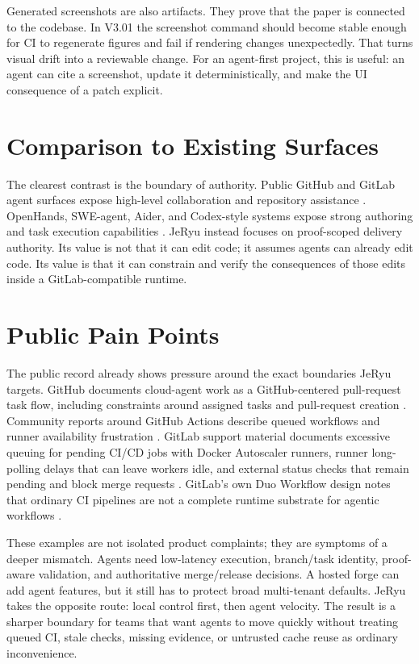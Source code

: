\documentclass[conference]{IEEEtran}
\begin{document}
Generated screenshots are also artifacts. They prove that the paper is connected to the codebase. In V3.01 the screenshot command should become stable enough for CI to regenerate figures and fail if rendering changes unexpectedly. That turns visual drift into a reviewable change. For an agent-first project, this is useful: an agent can cite a screenshot, update it deterministically, and make the UI consequence of a patch explicit.

\section{Comparison to Existing Surfaces}
The clearest contrast is the boundary of authority. Public GitHub and GitLab agent surfaces expose high-level collaboration and repository assistance \cite{github-copilot-cloud-agent,github-copilot-howto,gitlab-duo-platform,gitlab-duo-workflow}. OpenHands, SWE-agent, Aider, and Codex-style systems expose strong authoring and task execution capabilities \cite{openhands-repo,sweagent-paper,aider-repo,openai-codex}. JeRyu instead focuses on proof-scoped delivery authority. Its value is not that it can edit code; it assumes agents can already edit code. Its value is that it can constrain and verify the consequences of those edits inside a GitLab-compatible runtime.

\section{Public Pain Points}
The public record already shows pressure around the exact boundaries JeRyu targets. GitHub documents cloud-agent work as a GitHub-centered pull-request task flow, including constraints around assigned tasks and pull-request creation \cite{github-copilot-cloud-agent,github-copilot-howto}. Community reports around GitHub Actions describe queued workflows and runner availability frustration \cite{github-actions-queued-community}. GitLab support material documents excessive queuing for pending CI/CD jobs with Docker Autoscaler runners, runner long-polling delays that can leave workers idle, and external status checks that remain pending and block merge requests \cite{gitlab-autoscaler-queue,gitlab-runner-long-polling,gitlab-status-checks-pending}. GitLab's own Duo Workflow design notes that ordinary CI pipelines are not a complete runtime substrate for agentic workflows \cite{gitlab-duo-handbook}.

These examples are not isolated product complaints; they are symptoms of a deeper mismatch. Agents need low-latency execution, branch/task identity, proof-aware validation, and authoritative merge/release decisions. A hosted forge can add agent features, but it still has to protect broad multi-tenant defaults. JeRyu takes the opposite route: local control first, then agent velocity. The result is a sharper boundary for teams that want agents to move quickly without treating queued CI, stale checks, missing evidence, or untrusted cache reuse as ordinary inconvenience.
\end{document}
